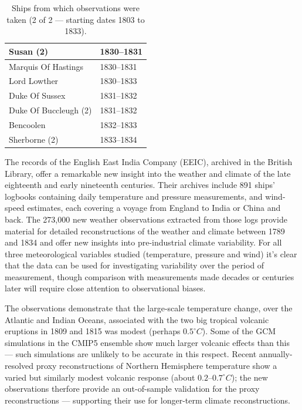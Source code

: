 \documentclass[CP]{copernicus}
\begin{document}
\begin{table}[!hbp]
\begin{minipage}[b]{0.5\linewidth}
{\begin{tabular}{|p{3.5cm}|p{3.5cm}|}
\hline
Susan (2) & 1830--1831\\
\hline
Marquis Of Hastings & 1830--1831\\
\hline
Lord Lowther & 1830--1833\\
\hline
Duke Of Sussex & 1831--1832\\
\hline
Duke Of Buccleugh (2) & 1831--1832\\
\hline
Bencoolen & 1832--1833\\
\hline
Sherborne (2) & 1833--1834\\
\hline
\end{tabular}
}
\end{minipage}
\vspace{0.5cm}
\caption{Ships from which observations were taken (2 of 2 --- starting dates 1803 to 1833).}
\label{T1.2}
\end{table}


\conclusions

The records of the English East India Company (EEIC), archived in the British Library, offer a remarkable new insight into the weather and climate of the late eighteenth and early nineteenth centuries. Their archives include 891 ships' logbooks containing daily temperature and pressure measurements, and wind-speed estimates, each covering a voyage from England to India or China and back. The 273,000 new weather observations extracted from those logs provide material for detailed reconstructions of the weather and climate between 1789 and 1834 and offer new insights into pre-industrial climate variability. For all three meteorological variables studied (temperature, pressure and wind) it's clear that the data can be used for investigating variability over the period of measurement, though comparison with measurements made decades or centuries later will require close attention to observational biases.

The observations demonstrate that the large-scale temperature change, over the Atlantic and Indian Oceans, associated with the two big tropical volcanic eruptions in 1809 and 1815 was modest (perhaps $0.5^\circ C$). Some of the GCM simulations in the CMIP5 ensemble show much larger volcanic effects than this --- such simulations are unlikely to be accurate in this respect. Recent annually-resolved proxy reconstructions of Northern Hemisphere temperature show a varied but similarly modest volcanic response (about $0.2$--$0.7^\circ C$); the new observations therfore provide an out-of-sample validation for the proxy reconstructions --- supporting their use for longer-term climate reconstructions.
\end{document}
